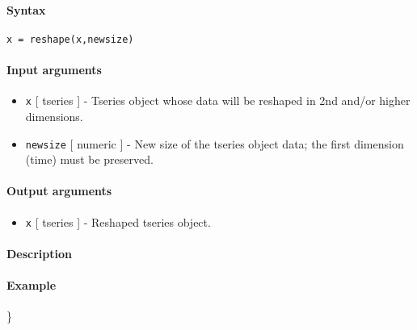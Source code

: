 


	\paragraph{Syntax}

\begin{verbatim}
x = reshape(x,newsize)
\end{verbatim}

\paragraph{Input arguments}

\begin{itemize}
\item
  \texttt{x} {[} tseries {]} - Tseries object whose data will be
  reshaped in 2nd and/or higher dimensions.
\item
  \texttt{newsize} {[} numeric {]} - New size of the tseries object
  data; the first dimension (time) must be preserved.
\end{itemize}

\paragraph{Output arguments}

\begin{itemize}
\itemsep1pt\parskip0pt
\item
  \texttt{x} {[} tseries {]} - Reshaped tseries object.
\end{itemize}

\paragraph{Description}

\paragraph{Example}

\}


